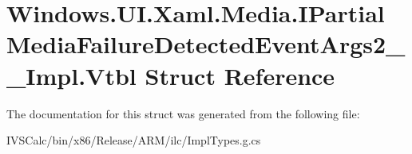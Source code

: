 \hypertarget{struct_windows_1_1_u_i_1_1_xaml_1_1_media_1_1_i_partial_media_failure_detected_event_args2_____impl_1_1_vtbl}{}\section{Windows.\+U\+I.\+Xaml.\+Media.\+I\+Partial\+Media\+Failure\+Detected\+Event\+Args2\+\_\+\+\_\+\+Impl.\+Vtbl Struct Reference}
\label{struct_windows_1_1_u_i_1_1_xaml_1_1_media_1_1_i_partial_media_failure_detected_event_args2_____impl_1_1_vtbl}


The documentation for this struct was generated from the following file\+:\begin{DoxyCompactItemize}
\item 
I\+V\+S\+Calc/bin/x86/\+Release/\+A\+R\+M/ilc/Impl\+Types.\+g.\+cs\end{DoxyCompactItemize}
